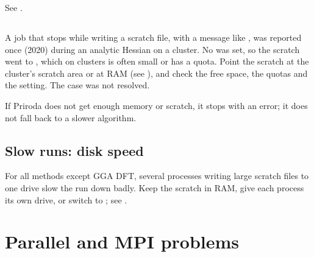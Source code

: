 \documentclass[letterpaper,10pt,english,openany,oneside]{sphinxmanual}
\begin{document}
\sphinxAtStartPar
See {\hyperref[\detokenize{reference/integral:integral-direct}]{}}. 


\subsection{}
\label{\detokenize{troubleshooting/common-problems:write-file-tmp}}
\sphinxAtStartPar
A job that stops while writing a scratch file, with a message like ,
was reported once (2020) during an analytic Hessian on a cluster. No  was set, so the scratch went to ,
which on clusters is often small or has a quota. Point the scratch at the cluster’s scratch area or at RAM (see
{\hyperref[\detokenize{start/running:running-scratch}]{}}), and check the free space, the quotas and the  setting. The case was not resolved.



\sphinxAtStartPar
If Priroda does not get enough memory or scratch, it stops with an error; it does not fall back to a slower
algorithm. 


\subsection{Slow runs: disk speed}
\label{\detokenize{troubleshooting/common-problems:slow-runs-disk-speed}}
\sphinxAtStartPar
For all methods except GGA DFT, several processes writing large scratch files to one drive slow the run down badly.
Keep the scratch in RAM, give each process its own drive, or switch to {\hyperref[\detokenize{reference/integral:integral-direct}]{}}; see
{\hyperref[\detokenize{start/running:running-disk-speed}]{}}.




\section{Parallel and MPI problems}
\label{\detokenize{troubleshooting/common-problems:parallel-and-mpi-problems}}\label{\detokenize{troubleshooting/common-problems:troubleshooting-parallel}}
\end{document}

